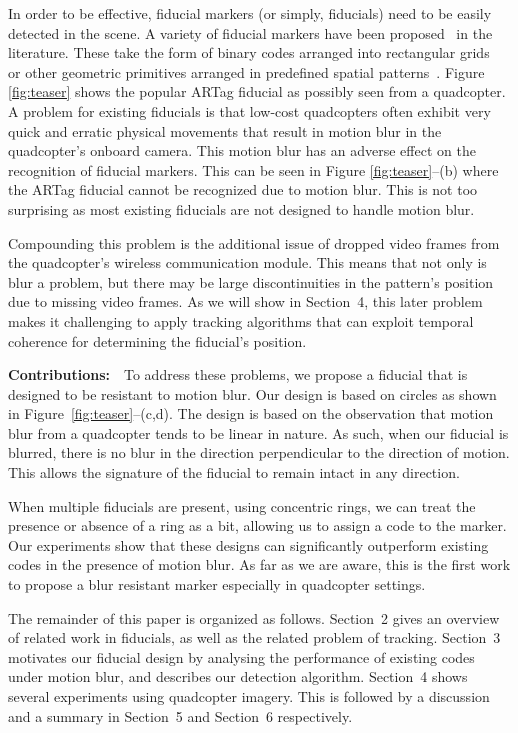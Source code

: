 \documentclass[10pt,twocolumn,letterpaper]{article}
\begin{document}
In order to be effective, fiducial markers (or simply, fiducials) need
to be easily detected in the scene. A variety of fiducial markers have
been proposed~\cite{NaimarkF02,ARToolkit02,Fiala05,Pitag13,runetag11}
in the literature.  These take the form of binary codes arranged into
rectangular grids~\cite{ARToolkit02,Fiala05} or other geometric
primitives arranged in predefined spatial
patterns~\cite{NaimarkF02,Pitag13,runetag11}.  Figure \ref{fig:teaser}
shows the popular ARTag \cite{Fiala05} fiducial as possibly seen from
a quadcopter. A problem for existing fiducials is that low-cost
quadcopters often exhibit very quick and erratic physical movements
that result in motion blur in the quadcopter's onboard camera. This
motion blur has an adverse effect on the recognition of fiducial
markers. This can be seen in Figure \ref{fig:teaser}--(b) where the
ARTag fiducial cannot be recognized due to motion blur. This is not
too surprising as most existing fiducials are not designed to handle
motion blur.

Compounding this problem is the additional issue of dropped video
frames from the quadcopter's wireless communication module. This means
that not only is blur a problem, but there may be large
discontinuities in the pattern's position due to missing video
frames. As we will show in Section~4, this later problem makes it
challenging to apply tracking algorithms that can exploit temporal
coherence for determining the fiducial's position.

\noindent\textbf{Contributions:}~~To address these problems, we propose a
fiducial that is designed to be resistant to motion blur. Our design
is based on circles as shown in Figure~\ref{fig:teaser}--(c,d). The
design is based on the observation that motion blur from a quadcopter
tends to be linear in nature. As such, when our fiducial is blurred,
there is no blur in the direction perpendicular to the direction of
motion.  This allows the signature of the fiducial to remain intact in
any direction.

When multiple fiducials are present, using concentric rings, we can
treat the presence or absence of a ring as a bit, allowing us to
assign a code to the marker. Our experiments show that these designs can
significantly outperform existing codes in the presence of motion
blur. As far as we are aware, this is the first work to propose a blur
resistant marker especially in quadcopter settings.

The remainder of this paper is organized as follows.  Section~2 gives
an overview of related work in fiducials, as well as the related
problem of tracking. Section~3 motivates our fiducial design by
analysing the performance of existing codes under motion blur, and
describes our detection algorithm. Section~4 shows several
experiments using quadcopter imagery. This is followed by a discussion
and a summary in Section~5 and Section~6 respectively.
\end{document}
